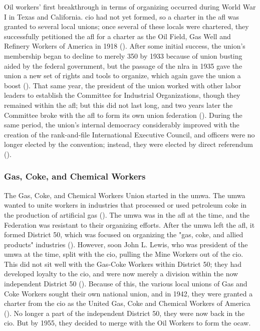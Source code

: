 \documentclass[12pt]{article}
\begin{document}
Oil workers’ first breakthrough in terms of organizing occurred during World War I in Texas and California. \acrfull{cio} had not yet formed, so a charter in the \acrfull{afl} was granted to several local unions; once several of these locals were chartered, they successfully petitioned the \acrshort{afl} for a charter as the Oil Field, Gas Well and Refinery Workers of America in 1918 (\cite[48]{ocawFactBookOil1960}). After some initial success, the union’s membership began to decline to merely 350 by 1933 because of union busting aided by the federal government, but the passage of the \acrfull{nlra} in 1935 gave the union a new set of rights and tools to organize, which again gave the union a boost (\cite[49]{ocawFactBookOil1960}). That same year, the president of the union worked with other labor leaders to establish the Committee for Industrial Organizations, though they remained within the \acrshort{afl}; but this did not last long, and two years later the Committee broke with the \acrshort{afl} to form its own union federation (\cite[49]{ocawFactBookOil1960}). During the same period, the union’s internal democracy considerably improved with the creation of the rank-and-file International Executive Council, and officers were no longer elected by the convention; instead, they were elected by direct referendum (\cite[49--50]{ocawFactBookOil1960}).

\subsubsection{Gas, Coke, and Chemical Workers}

The Gas, Coke, and Chemical Workers Union started in the \acrfull{umwa}. The \acrshort{umwa} wanted to unite workers in industries that processed or used petroleum coke in the production of artificial gas (\cite[50]{ocawFactBookOil1960}). The \acrshort{umwa} was in the \acrshort{afl} at the time, and the Federation was resistant to their organizing efforts. After the \acrshort{umwa} left the \acrshort{afl}, it formed District 50, which was focused on organizing the "gas, coke, and allied products" industries (\cite[50--51]{ocawFactBookOil1960}). However, soon John L. Lewis, who was president of the \acrshort{umwa} at the time, split with the \acrshort{cio}, pulling the Mine Workers out of the \acrshort{cio}. This did not sit well with the Gas-Coke Workers within District 50; they had developed loyalty to the \acrshort{cio}, and were now merely a division within the now independent District 50 (\cite[51]{ocawFactBookOil1960}). Because of this, the various local unions of Gas and Coke Workers sought their own national union, and in 1942, they were granted a charter from the \acrshort{cio} as the United Gas, Coke and Chemical Workers of America (\cite[51]{ocawFactBookOil1960}). No longer a part of the independent District 50, they were now back in the \acrshort{cio}. But by 1955, they decided to merge with the Oil Workers to form the \acrfull{ocaw}.
\end{document}
